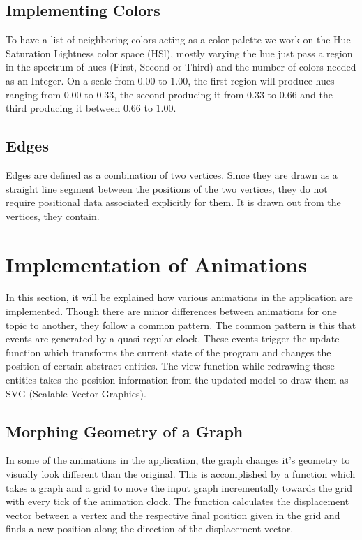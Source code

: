 \subsection{Implementing Colors}
To have a list of neighboring colors acting as a color palette we work on the
Hue Saturation Lightness color space (HSl), mostly varying the hue just pass a
region in the spectrum of hues (First, Second or Third) and the number of
colors needed as an Integer. On a scale from $0.00$ to $1.00$, the first region
will produce hues ranging from $0.00$ to $0.33$, the second producing it from
$0.33$ to $0.66$ and the third producing it between $0.66$ to $1.00$.

\subsection{Edges}
Edges are defined as a combination of two vertices. Since they are drawn as a
straight line segment between the positions of the two vertices, they do not require
positional data associated explicitly for them. It is drawn out from the vertices,
they contain.


\section{Implementation of Animations}
In this section, it will be explained how various animations in the
application are implemented. Though there are minor differences between animations
for one topic to another, they follow a common pattern. The common pattern is
this that events are generated by a quasi-regular clock. These events trigger
the update function which transforms the current state of the program and
changes the position of certain abstract entities. The view function while
redrawing these entities takes the position information from the updated model
to draw them as SVG (Scalable Vector Graphics).

\subsection{Morphing Geometry of a Graph}
In some of the animations in the application, the graph changes it's geometry
to visually look different than the original. This is accomplished by a
function which takes a graph and a grid to move the input graph incrementally
towards the grid with every tick of the animation clock. The function
calculates the displacement vector between a vertex and the respective final
position given in the grid and finds a new position along the direction of the
displacement vector.

